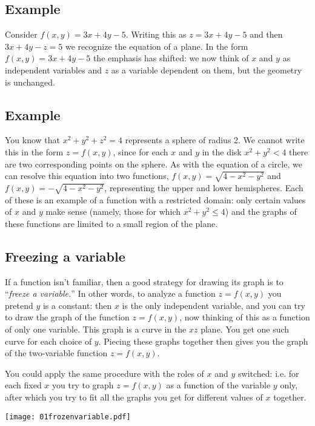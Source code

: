 \subsection{Example}\label{sec:example-of-a-function1} Consider %
$f(x,y)=3x+4y-5$. Writing this as $z=3x+4y-5$ and then $3x+4y-z=5$ we
recognize the equation of a plane.  In the form $f(x,y)=3x+4y-5$ the
emphasis has shifted: we now think of $x$ and $y$ as independent
variables and $z$ as a variable dependent on them, but the geometry is
unchanged.

\subsection{Example}\label{sec:example-of-a-function2} You know that %
$x^2+y^2+z^2=4$ represents a sphere of radius 2. We cannot write this
in the form $z=f(x,y)$, since for each $x$ and $y$ in the disk
$x^2+y^2<4$ there are two corresponding points on the sphere. As with
the equation of a circle, we can resolve this equation into two
functions, $f(x,y)=\sqrt{4-x^2-y^2}$ and $f(x,y)=-\sqrt{4-x^2-y^2}$,
representing the upper and lower hemispheres. Each of these is an
example of a function with a restricted domain: only certain values of
$x$ and $y$ make sense (namely, those for which $x^2+y^2\le 4$) and
the graphs of these functions are limited to a small region of the
plane.


\subsection{Freezing a variable} %
\begin{multicols}{2}
If a function isn't familiar, then a good strategy for drawing its
graph is to ``\emph{freeze a variable.}'' In other words, to analyze
a function $ z=f(x,y) $ you pretend $ y $ is a constant: then $ x $
is the only independent variable, and you can try to draw the graph
of the function $ z=f(x,y) $, now thinking of this as a function of
only one variable. This graph is a curve in the $ xz $ plane. You
get one such curve for each choice of $ y $. Piecing these graphs
together then gives you the graph of the two-variable function $
z=f(x,y) $.

You could apply the same procedure with the roles of $ x $ and $ y $
switched: i.e. for each fixed $ x $ you try to graph $ z=f(x,y) $ as
a function of the variable $ y $ only, after which you try to fit
all the graphs you get for different values of $ x $ together.

\centerline{\texttt{[image: 01frozenvariable.pdf]} }
\end{multicols}




